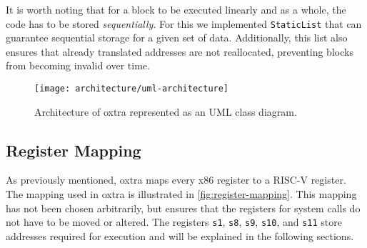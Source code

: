 		It is worth noting that for a block to be executed linearly and as a whole, the code has to be stored \emph{sequentially}. For this we implemented \texttt{StaticList} that can guarantee sequential storage for a given set of data. Additionally, this list also ensures that already translated addresses are not reallocated, preventing blocks from becoming invalid over time.

	\begin{figure}
		\centering
		\texttt{[image: architecture/uml-architecture]}
		\caption[In-Depth UML Architecture]{Architecture of oxtra represented as an UML class diagram.}
		\label{fig:uml-architecture}
	\end{figure}

\subsection{Register Mapping}
As previously mentioned, oxtra maps every x86 register to a RISC-V register. The mapping used in oxtra is illustrated in \autoref{fig:register-mapping}. This mapping has not been chosen arbitrarily, but ensures that the registers for system calls do not have to be moved or altered. The registers \texttt{s1}, \texttt{s8}, \texttt{s9}, \texttt{s10}, and \texttt{s11} store addresses required for execution and will be explained in the following sections. 
